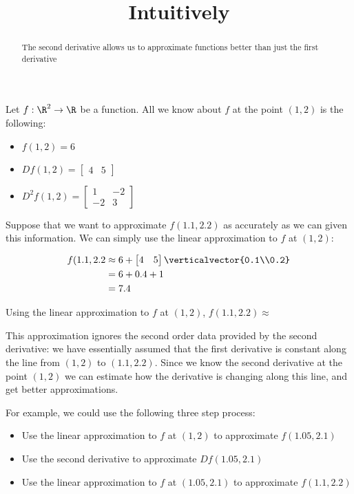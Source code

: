 \documentclass{ximera}
\title{Intuitively}
\begin{document}
	\begin{abstract}
		The second derivative allows us to approximate functions better than just the first derivative
	\end{abstract}
	
	\begin{question}
	Let $f:\R^2 \to \R$ be a function.  All we know about $f$ at the point $(1,2)$ is the following:
		\begin{itemize}
			\item $f(1,2) = 6$
			\item \(Df(1,2) = \begin{bmatrix} 4 & 5 \end{bmatrix}\)
			\item \( D^2f(1,2)  = \begin{bmatrix} 1 & -2 \\ -2 & 3\end{bmatrix}\)
		\end{itemize} 
		
		Suppose that we want to approximate $f(1.1,2.2)$ as accurately as we can given this information.
		We can simply use the linear approximation to $f$ at $(1,2)$:
		
		\begin{solution}
			\begin{hint}
				\begin{align*}
					f(1.1,2.2 &\approx 6+\begin{bmatrix} 4 & 5 \end{bmatrix} \verticalvector{0.1\\0.2}\\
							&=6+0.4+1\\
							&=7.4
				\end{align*}
			\end{hint}
			Using the linear approximation to $f$ at $(1,2)$, $f(1.1,2.2) \approx$ 
		\end{solution}
		
		This approximation ignores the second order data provided by the second derivative: we have essentially 
		assumed that the first derivative is constant along the line from $(1,2)$ to $(1.1,2.2)$.  Since we know the second 
		derivative at the point $(1,2)$ we can estimate how the derivative is changing along this line, and get better approximations.
		
		For example, we could use the following three step process:
		
		\begin{itemize}
			\item Use the linear approximation to $f$ at $(1,2)$ to approximate $f(1.05,2.1)$
			\item Use the second derivative to approximate $Df(1.05,2.1)$
			\item Use the linear approximation to $f$ at $(1.05,2.1)$ to approximate $f(1.1,2.2)$
		\end{itemize}
		

\end{question}
\end{document}
